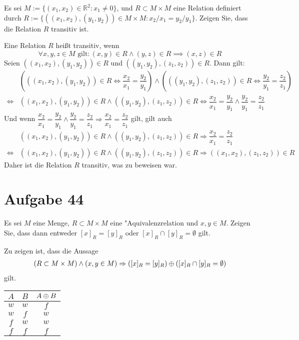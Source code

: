 \documentclass[10pt, oneside]{article}
\begin{document}
Es sei $M := \{(x_1, x_2) \in \mathbb{R}^2 : x_1 \neq 0\}$, und $R \subset M
\times M$ eine Relation definiert durch $R := \{((x_1, x_2), (y_1, y_2)) \in M
\times M : x_2/x_1 = y_2/y_1\}$. Zeigen Sie, dass die Relation $R$ transitiv
ist.

Eine Relation $R$ hei{\ss}t transitiv, wenn
\begin{equation*}
    \forall x,y,z \in M \text{ gilt} : (x, y) \in R \land (y, z) \in R \implies (x, z) \in R
\end{equation*}
Seien $((x_1, x_2), (y_1, y_2)) \in R$ und $((y_1, y_2), (z_1, z_2)) \in R$.
Dann gilt:
\begin{align*}
    &\left(((x_1, x_2), (y_1, y_2)) \in R \Leftrightarrow \dfrac{x_2}{x_1} = \dfrac{y_2}{y_1}\right)
    \land
    \left(((y_1, y_2), (z_1, z_2)) \in R \Leftrightarrow \dfrac{y_2}{y_1} = \dfrac{z_2}{z_1}\right) \\[5pt]
    \iff&
    ((x_1, x_2), (y_1, y_2)) \in R \land ((y_1, y_2), (z_1, z_2)) \in R
    \Leftrightarrow
    \dfrac{x_2}{x_1} = \dfrac{y_2}{y_1} \land \dfrac{y_2}{y_1} = \dfrac{z_2}{z_1}
\end{align*}
Und wenn $\dfrac{x_2}{x_1} = \dfrac{y_2}{y_1} \land \dfrac{y_2}{y_1} =
\dfrac{z_2}{z_1} \Rightarrow \dfrac{x_2}{x_1} = \dfrac{z_2}{z_1}$ gilt, gilt auch
\begin{align*}
    &((x_1, x_2), (y_1, y_2)) \in R \land ((y_1, y_2), (z_1, z_2)) \in R
    \Rightarrow
    \dfrac{x_2}{x_1} = \dfrac{z_2}{z_1} \\[5pt]
    \iff&
    ((x_1, x_2), (y_1, y_2)) \in R \land ((y_1, y_2), (z_1, z_2)) \in R
    \Rightarrow
    ((x_1, x_2), (z_1, z_2)) \in R
\end{align*}
Daher ist die Relation $R$ transitiv, was zu beweisen war.

\pagebreak
\section{Aufgabe 44}

Es sei $M$ eine Menge, $R \subset M \times M$ eine "Aquivalenzrelation und $x,
y \in M$. Zeigen Sie, dass dann entweder $[x]_R = [y]_R$ oder $[x]_R \cap [y]_R
= \emptyset$ gilt.

Zu zeigen ist, dass die Aussage
\begin{align*}
    (R \subset M \times M) \land (x, y \in M) \Rightarrow ([x]_R = [y]_R) \oplus ([x]_R \cap [y]_R = \emptyset)
\end{align*}
gilt.
\begin{table*}[h]
    \centering
    \begin{tabular}{|c|c|c|}
        \hline
        $A$ & $B$ & $A \oplus B$ \\
        \hline
        $w$ & $w$ & $f$ \\
        \hline
        $w$ & $f$ & $w$ \\
        \hline
        $f$ & $w$ & $w$ \\
        \hline
        $f$ & $f$ & $f$ \\
        \hline
    \end{tabular}
\end{table*}
\end{document}
